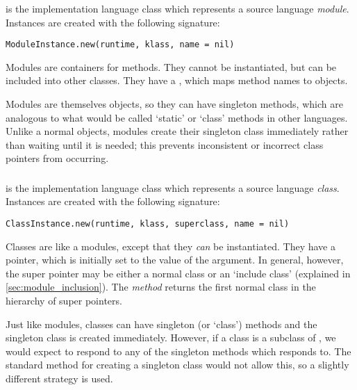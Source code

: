 \newpage
\subsubsection{}

 is the implementation language class which represents a source language \textit{module}. Instances are created with the following signature:

\begin{lstlisting}
ModuleInstance.new(runtime, klass, name = nil)
\end{lstlisting}

Modules are containers for methods. They cannot be instantiated, but can be included into other classes. They have a , which maps method names to  objects.

Modules are themselves objects, so they can have singleton methods, which are analogous to what would be called `static' or `class' methods in other languages. Unlike a normal objects, modules create their singleton class immediately rather than waiting until it is needed; this prevents inconsistent or incorrect class pointers from occurring.

\subsubsection{}

 is the implementation language class which represents a source language \textit{class}. Instances are created with the following signature:

\begin{lstlisting}
ClassInstance.new(runtime, klass, superclass, name = nil)
\end{lstlisting}

Classes are like a modules, except that they \textit{can} be instantiated. They have a  pointer, which is initially set to the value of the  argument. In general, however, the super pointer may be either a normal class or an `include class' (explained in \autoref{sec:module_inclusion}). The  \textit{method} returns the first normal class in the hierarchy of super pointers.

Just like modules, classes can have singleton (or `class') methods and the singleton class is created immediately. However, if a class  is a subclass of , we would expect  to respond to any of the singleton methods which  responds to. The standard method for creating a singleton class would not allow this, so a slightly different strategy is used.

